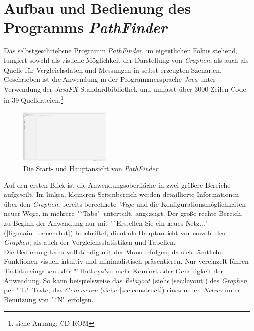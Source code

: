 \documentclass[12pt]{article}
\begin{document}
\section{Aufbau und Bedienung des Programms \textit{PathFinder}}
\label{sec:manual}
Das selbstgeschriebene Programm \textit{PathFinder}, im eigentlichen Fokus stehend, fungiert sowohl als visuelle Möglichkeit der Darstellung von \textit{Graphen}, als auch als Quelle für Vergleichsdaten und Messungen in selbst erzeugten Szenarien. Geschrieben ist die Anwendung in der Programmiersprache \textit{Java} unter Verwendung der \textit{JavaFX}-Standardbibliothek \cite{javafx} und umfasst über 3000 Zeilen Code in 39 Quelldateien.\footnote{siehe Anhang: CD-ROM}
\begin{figure}
\vspace{-20pt}
\begin{center}
\includegraphics[width=0.4\textwidth]{res/main_screenshot.png}
\end{center}
\vspace{-30pt}
\centering
\caption{Die Start- und Hauptansicht von \textit{PathFinder}}
\label{fig:main_screenshot}
\end{figure}
\noindent Auf den ersten Blick ist die Anwendungsoberfläche in zwei größere Bereiche aufgeteilt. Im linken, kleineren Seitenbereich werden detaillierte Informationen über den \textit{Graphen}, bereits berechnete \textit{Wege} und die Konfigurationsmöglichkeiten neuer Wege, in mehrere "`Tabs"\ unterteilt, angezeigt. Der große rechte Bereich, zu Beginn der Anwendung nur mit "`Erstellen Sie ein neues Netz..." (\autoref{fig:main_screenshot}) beschriftet, dient als Hauptansicht von sowohl des \textit{Graphen}, als auch der Vergleichsstatistiken und Tabellen.
\\
Die Bedienung kann vollständig mit der Maus erfolgen, da sich sämtliche Funktionen visuell intuitiv und minimalistisch präsentieren. Nur vereinzelt führen Tastatureingaben oder "`Hotkeys"\;zu mehr Komfort oder Genauigkeit der Anwendung. So kann beispielsweise das \textit{Relayout} (siehe \autoref{sec:layout}) des \textit{Graphen} per "`L"\ Taste, das \textit{Generieren} (siehe \autoref{sec:construct}) eines neuen \textit{Netzes} unter Benutzung von "`N"\ erfolgen.
\end{document}
